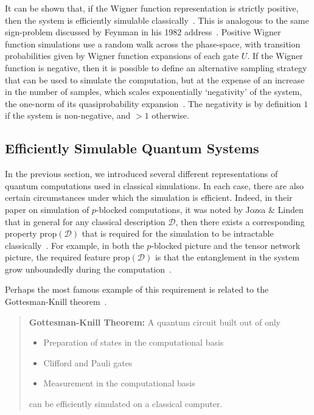 It can be shown that, if the Wigner function representation is strictly positive, then the system is efficiently simulable classically~\cite{Bartlett2002,Mari2012}. This is analogous to the same sign-problem discussed by Feynman in his 1982 address~\cite{Feynman1982}. Positive Wigner function simulations use a random walk across the phase-space, with transition probabilities given by Wigner function expansions of each gate $U$. If the Wigner function is negative, then it is possible to define an alternative sampling strategy that can be used to simulate the computation, but at the expense of an increase in the number of samples, which scales exponentially `negativity' of the system, the one-norm of its quasiprobability expansion~\cite{Pashayan2015}. The negativity is by definition $1$ if the system is non-negative, and $>1$ otherwise.
\subsection{Efficiently Simulable Quantum Systems}\label{sec:intro_efficient_simulations}
In the previous section, we introduced several different representations of quantum computations used in classical simulations. In each case, there are also certain circumstances under which the simulation is efficient. Indeed, in their paper on simulation of $p$-blocked computations, it was noted by Jozsa \& Linden that in general for any classical description $\mathcal{D}$, then there exists a corresponding property $\text{prop}\left(\mathcal{D}\right)$ that is required for the simulation to be intractable classically~\cite{Jozsa2003}. For example, in both the $p$-blocked picture and the tensor network picture, the required feature $\text{prop}\left(\mathcal{D}\right)$ is that the entanglement in the system grow unboundedly during the computation~\cite{Jozsa2003,Vidal2003}.\par
Perhaps the most famous example of this requirement is related to the Gottesman-Knill theorem~\cite{Gottesman1998b,Jozsa2003}.
\begin{quote}
\textbf{Gottesman-Knill Theorem:} A quantum circuit built out of only 
\begin{itemize}
    \item Preparation of states in the computational basis
    \item Clifford and Pauli gates
    \item Measurement in the computational basis
\end{itemize}
can be efficiently simulated on a classical computer.
\end{quote}
